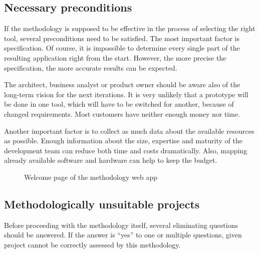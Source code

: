 \documentclass[english,master,public,dept460,male,cpdeclaration,oneside]{diploma}
\begin{document}
\subsection{Necessary preconditions}
If the methodology is supposed to be effective in the process of selecting the right tool, several preconditions need to be satisfied. The most important factor is specification. Of course, it is impossible to determine every single part of the resulting application right from the start. However, the more precise the specification, the more accurate results can be expected. 

The architect, business analyst or product owner should be aware also of the long-term vision for the next iterations. It is very unlikely that a prototype will be done in one tool, which will have to be switched for another, because of changed requirements. Most customers have neither enough money nor time.

Another important factor is to collect as much data about the available resources as possible. Enough information about the size, expertise and maturity of the development team can reduce both time and costs dramatically. Also, mapping already available software and hardware can help to keep the budget.

\begin{figure}
	\centering{}
	\caption{Welcome page of the methodology web app}
\end{figure}

\subsection{Methodologically unsuitable projects}

Before proceeding with the methodology itself, several eliminating questions should be answered. If the answer is “yes” to one or multiple questions, given project cannot be correctly assessed by this methodology.
\end{document}
